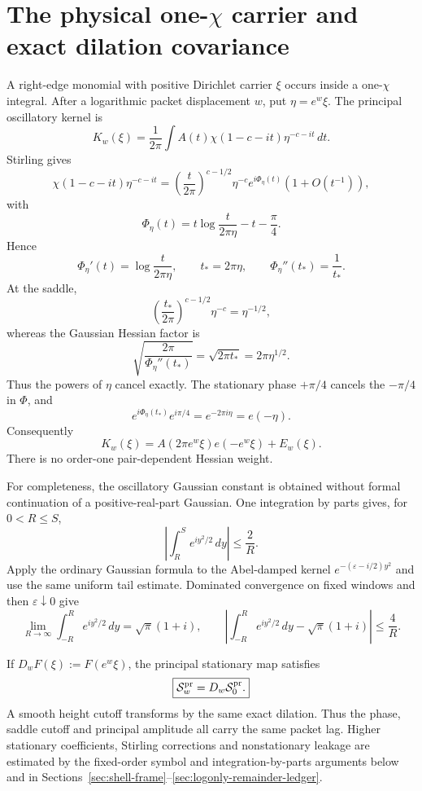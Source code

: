 \section{The physical \texorpdfstring{one-$\chi$}{one-chi} carrier and exact dilation covariance}
\label{sec:stationary}

A right-edge monomial with positive Dirichlet carrier $\xi$ occurs inside a
one-$\chi$ integral.  After a logarithmic packet displacement $w$, put
$\eta=e^w\xi$. The principal oscillatory kernel is
\[
K_w(\xi)
=\frac1{2\pi}\int A(t)\chi(1-c-it)\eta^{-c-it}\,dt.
\]
Stirling gives
\[
\chi(1-c-it)\eta^{-c-it}
=\left(\frac{t}{2\pi}\right)^{c-1/2}\eta^{-c}
 e^{i\Phi_\eta(t)}(1+O(t^{-1})),
\]
with
\[
\Phi_\eta(t)=t\log\frac{t}{2\pi\eta}-t-\frac\pi4.
\]
Hence
\[
\Phi_\eta'(t)=\log\frac{t}{2\pi\eta},
\qquad
t_*=2\pi\eta,
\qquad
\Phi_\eta''(t_*)=\frac1{t_*}.
\]
At the saddle,
\[
\left(\frac{t_*}{2\pi}\right)^{c-1/2}\eta^{-c}=\eta^{-1/2},
\]
whereas the Gaussian Hessian factor is
\[
\sqrt{\frac{2\pi}{\Phi_\eta''(t_*)}}
=\sqrt{2\pi t_*}=2\pi\eta^{1/2}.
\]
Thus the powers of $\eta$ cancel exactly. The stationary phase $+\pi/4$
cancels the $-\pi/4$ in $\Phi$, and
\[
e^{i\Phi_\eta(t_*)}e^{i\pi/4}=e^{-2\pi i\eta}=e(-\eta).
\]
Consequently
\begin{equation}
\boxed{
K_w(\xi)=A(2\pi e^w\xi)e(-e^w\xi)+E_w(\xi).
}
\label{eq:stationary-dilation}
\end{equation}
There is no order-one pair-dependent Hessian weight.

For completeness, the oscillatory Gaussian constant is obtained without
formal continuation of a positive-real-part Gaussian.  One integration by
parts gives, for $0<R\le S$,
\begin{equation}
\boxed{
\left|\int_R^S e^{iy^2/2}\,dy\right|\le\frac2R.
}
\label{eq:fresnel-tail}
\end{equation}
Apply the ordinary Gaussian formula to the Abel-damped kernel
$e^{-(\varepsilon-i/2)y^2}$ and use the same uniform tail estimate.  Dominated
convergence on fixed windows and then $\varepsilon\downarrow0$ give
\begin{equation}
\boxed{
\lim_{R\to\infty}\int_{-R}^R e^{iy^2/2}\,dy
=\sqrt\pi(1+i),
\qquad
\left|\int_{-R}^R e^{iy^2/2}\,dy-\sqrt\pi(1+i)\right|
\le\frac4R.
}
\label{eq:fresnel-window}
\end{equation}

If $D_wF(\xi):=F(e^w\xi)$, the principal stationary map satisfies
\begin{equation}
\boxed{\mathcal S_w^{\rm pr}=D_w\mathcal S_0^{\rm pr}.}
\label{eq:dilation-covariance}
\end{equation}
A smooth height cutoff transforms by the same exact dilation.  Thus the phase,
saddle cutoff and principal amplitude all carry the same packet lag.  Higher
stationary coefficients, Stirling corrections and nonstationary leakage are
estimated by the fixed-order symbol and integration-by-parts arguments below
and in Sections~\ref{sec:shell-frame}--\ref{sec:logonly-remainder-ledger}.

